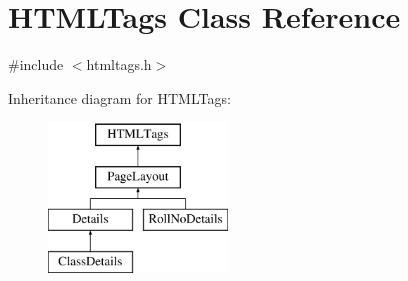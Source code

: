 \hypertarget{classHTMLTags}{\section{H\-T\-M\-L\-Tags Class Reference}
\label{classHTMLTags}
}


{\ttfamily \#include $<$htmltags.\-h$>$}

Inheritance diagram for H\-T\-M\-L\-Tags\-:\begin{figure}[H]
\begin{center}
\leavevmode
\includegraphics[height=4.000000cm]{classHTMLTags}
\end{center}
\end{figure}
